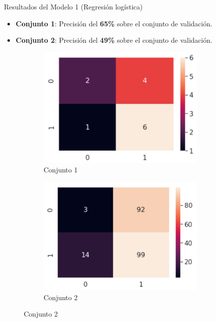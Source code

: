 \documentclass[10pt]{beamer}
\begin{document}
\begin{frame}{Resultados del Modelo 1 (Regresión logística)}
  \begin{itemize}
  	\item \textbf{Conjunto 1}: Precisión del \textbf{65\%} sobre el conjunto de validación.
  	\item \textbf{Conjunto 2}: Precisión del \textbf{49\%} sobre el conjunto de validación.
  \end{itemize}
  \begin{figure}[!htb]
    \begin{subfigure}[b]{0.45\linewidth}
    	\centering
	    \includegraphics[width=0.9\textwidth]{images/resultados_lr_cm_conjunto1.png}
	    \caption{Conjunto 1}
	\end{subfigure}
	\begin{subfigure}[b]{0.45\linewidth} 
		\centering
		\includegraphics[width=0.9\textwidth]{images/resultados_lr_cm_conjunto2.png}
	    \caption{Conjunto 2}
	\end{subfigure}
  \end{figure}
\end{frame}
\end{document}
